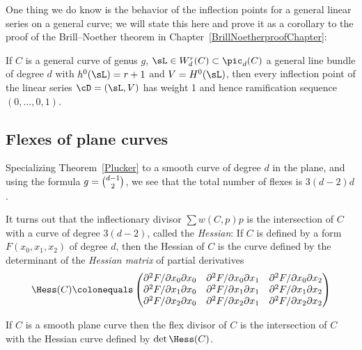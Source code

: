 One thing we do know is the behavior of the inflection points for a
general linear series on a general curve; we will state this here and
prove it as a corollary to the proof of the Brill--Noether theorem in
Chapter~\ref{BrillNoetherproofChapter}:

\begin{theorem}\label{Brill Noether Plucker}
If $C$ is a general curve of genus $g$, $\sL \in W^r_d(C) \subset
\pic_d(C)$ a general line bundle of degree $d$ with $h^0(\sL) = r+1$ and
$V = H^0(\sL)$, then every inflection point of the linear series $\cD =
(\sL, V)$ has weight 1 and hence ramification sequence $(0, \dots, 0, 1)$.
\end{theorem}


\subsection*{Flexes of plane curves}
\label{plane curve pluecker}

Specializing Theorem~\ref{Plucker} to a smooth curve of degree $d$
in the plane, and using the formula
$g= \tbinom{d-1}{2}$, we see that the total number of flexes is $3(d-2)d$.

It turns out that the
inflectionary divisor
%
$\sum w(C, p)p$
is the intersection of $C$ with a curve of degree $3(d-2)$, called the
%
%
\emph{Hessian}: If $C$ is defined by a form $F(x_0, x_1, x_2)$ of degree
$d$, then
the Hessian of $C$ is the curve defined by the determinant of the
\emph{Hessian matrix} of partial derivatives
$$
\Hess(C) \colonequals
\begin{pmatrix}
 \partial^2 F/\partial x_0 \partial x_0 & \partial^2 F/\partial x_0
 \partial x_1 & \partial^2 F/\partial x_0 \partial x_2 \\
\partial^2 F/\partial x_1 \partial x_0 & \partial^2 F/\partial x_1
\partial x_1 & \partial^2 F/\partial x_1 \partial x_2 \\
\partial^2 F/\partial x_2 \partial x_0 & \partial^2 F/\partial x_2
\partial x_1 & \partial^2 F/\partial x_2 \partial x_2
\end{pmatrix}
$$

\begin{theorem}\label{Hessian} If $C$ is a smooth plane curve then the
%
flex divisor of $C$ is the intersection
of $C$ with the Hessian curve defined by $\det \Hess(C)$.
\unif
\end{theorem}

